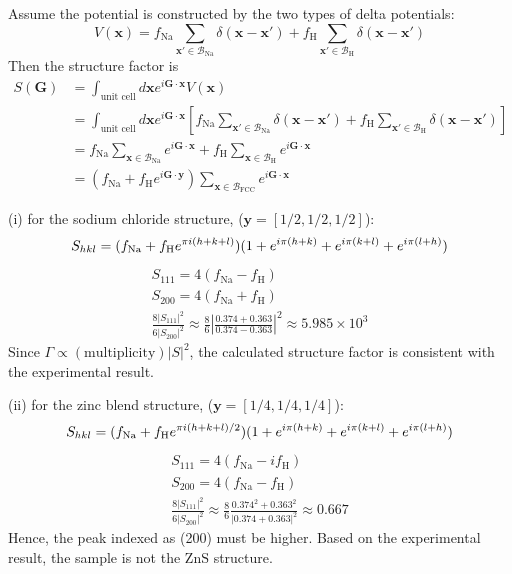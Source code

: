 \documentclass[a4paper,11pt]{article}
\begin{document}
Assume the potential is constructed by the two types of delta potentials: 
\begin{equation}
    V(\mathbf x)=f_{\mathrm{Na}}\sum_{\mathbf x'\in\mathcal B_{\mathrm{Na}}}\delta(\mathbf x-\mathbf x')+f_{\mathrm{H}}\sum_{\mathbf x'\in\mathcal B_{\mathrm{H}}}\delta(\mathbf x-\mathbf x')
\end{equation}
Then the structure factor is
\begin{align}
    S(\mathbf G)
    &=\int_{\text{unit cell}}d\mathbf x e^{i\mathbf G\cdot\mathbf x}V(\mathbf x) \\
    &=\int_{\text{unit cell}}d\mathbf x e^{i\mathbf G\cdot\mathbf x}\left[f_{\mathrm{Na}}\sum_{\mathbf x'\in\mathcal B_{\mathrm{Na}}}\delta(\mathbf x-\mathbf x')+f_{\mathrm{H}}\sum_{\mathbf x'\in\mathcal B_{\mathrm{H}}}\delta(\mathbf x-\mathbf x')\right]\\
    &=f_{\mathrm{Na}}\sum_{\mathbf x\in\mathcal B_{\mathrm{Na}}}e^{i\mathbf G\cdot\mathbf x}+f_{\mathrm{H}}\sum_{\mathbf x\in\mathcal B_{\mathrm{H}}}e^{i\mathbf G\cdot\mathbf x} \\
    &=(f_{\mathrm{Na}} + f_{\mathrm{H}}e^{i\mathbf G\cdot \mathbf y})\sum_{\mathbf x\in\mathcal B_{\mathrm{FCC}}}e^{i\mathbf G\cdot\mathbf x}
\end{align}

(i) for the sodium chloride structure, ($\mathbf y=[1/2, 1/2, 1/2]$):
\begin{equation}
    S_{hkl}=(f_{\mathrm{Na}} + f_{\mathrm{H}}e^{\pi i(h+k+l)})(1+e^{i\pi(h+k)}+e^{i\pi(k+l)}+e^{i\pi(l+h)})\\
\end{equation}
\begin{gather}
    S_{111}=4(f_{\mathrm{Na}} - f_{\mathrm{H}})\\
    S_{200}=4(f_{\mathrm{Na}} + f_{\mathrm{H}})\\
    \frac{8|S_{111}|^2}{6|S_{200}|^2} \approx\frac{8}{6}\left|\frac{0.374 + 0.363}{0.374 - 0.363}\right|^2\approx 5.985\times 10^3
\end{gather}
Since $\Gamma\propto (\text{multiplicity})|S|^2$, the calculated structure factor is consistent with the experimental result.


(ii) for the zinc blend structure, ($\mathbf y=[1/4, 1/4, 1/4]$):
\begin{equation}
    S_{hkl}=(f_{\mathrm{Na}} + f_{\mathrm{H}}e^{\pi i(h+k+l)/2})(1+e^{i\pi(h+k)}+e^{i\pi(k+l)}+e^{i\pi(l+h)})\\
\end{equation}
\begin{gather}
    S_{111}=4(f_{\mathrm{Na}} -i f_{\mathrm{H}})\\
    S_{200}=4(f_{\mathrm{Na}} - f_{\mathrm{H}})\\
    \frac{8|S_{111}|^2}{6|S_{200}|^2} \approx\frac{8}{6}\frac{0.374^2 + 0.363^2}{|0.374 + 0.363|^2}\approx 0.667
\end{gather}
Hence, the peak indexed as (200) must be higher. Based on the experimental result, the sample is not the $\mathrm{ZnS}$ structure.  
\end{document}
